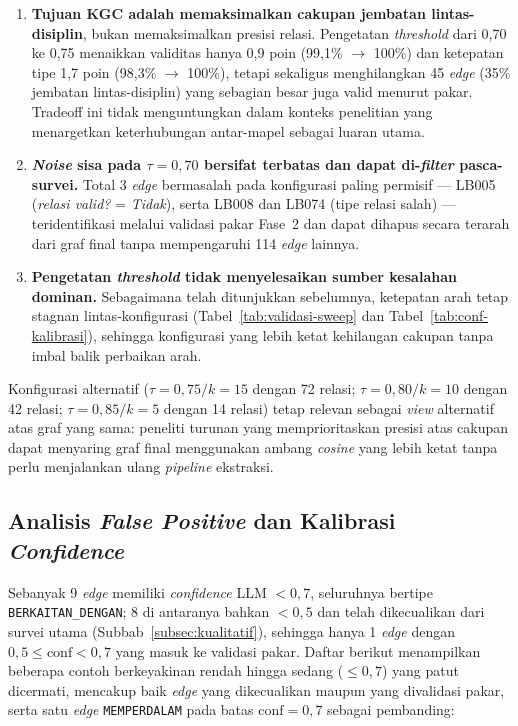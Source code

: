 \documentclass[main]{subfiles}
\begin{document}
\begin{enumerate}
  \item \textbf{Tujuan KGC adalah memaksimalkan cakupan jembatan
    lintas-disiplin}, bukan memaksimalkan presisi relasi. Pengetatan
    \textit{threshold} dari 0{,}70 ke 0{,}75 menaikkan validitas hanya
    0{,}9 poin (99{,}1\% $\to$ 100\%) dan ketepatan tipe 1{,}7 poin
    (98{,}3\% $\to$ 100\%), tetapi sekaligus menghilangkan 45
    \textit{edge} (35\% jembatan lintas-disiplin) yang sebagian besar
    juga valid menurut pakar. Tradeoff ini tidak menguntungkan dalam
    konteks penelitian yang menargetkan keterhubungan antar-mapel
    sebagai luaran utama.

  \item \textbf{\textit{Noise} sisa pada $\tau=0{,}70$ bersifat terbatas
    dan dapat di-\textit{filter} pasca-survei.} Total 3 \textit{edge}
    bermasalah pada konfigurasi paling permisif --- LB005
    (\textit{relasi valid?} = \textit{Tidak}), serta LB008 dan LB074
    (tipe relasi salah) --- teridentifikasi melalui validasi pakar Fase~2
    dan dapat dihapus secara terarah dari graf final tanpa
    mempengaruhi 114 \textit{edge} lainnya.

  \item \textbf{Pengetatan \textit{threshold} tidak menyelesaikan sumber
    kesalahan dominan.} Sebagaimana telah ditunjukkan sebelumnya, ketepatan
    arah tetap stagnan lintas-konfigurasi (Tabel~\ref{tab:validasi-sweep}
    dan Tabel~\ref{tab:conf-kalibrasi}), sehingga konfigurasi yang lebih
    ketat kehilangan cakupan tanpa imbal balik perbaikan arah.
\end{enumerate}

Konfigurasi alternatif ($\tau = 0{,}75 / k=15$ dengan 72 relasi;
$\tau = 0{,}80 / k=10$ dengan 42 relasi; $\tau = 0{,}85 / k=5$ dengan
14 relasi) tetap relevan sebagai \textit{view} alternatif atas graf
yang sama: peneliti turunan yang memprioritaskan presisi atas cakupan
dapat menyaring graf final menggunakan ambang \textit{cosine}
yang lebih ketat tanpa perlu menjalankan ulang \textit{pipeline}
ekstraksi.

\subsection{Analisis \textit{False Positive} dan Kalibrasi \textit{Confidence}}\label{subsubsec:false-positive}

Sebanyak 9 \textit{edge} memiliki \textit{confidence} LLM $< 0{,}7$,
seluruhnya bertipe \texttt{BERKAITAN\_DENGAN}; 8 di antaranya bahkan
$< 0{,}5$ dan telah dikecualikan dari survei utama
(Subbab~\ref{subsec:kualitatif}), sehingga hanya 1 \textit{edge} dengan
$0{,}5\!\le\!\text{conf}\!<\!0{,}7$ yang masuk ke validasi pakar. Daftar
berikut menampilkan beberapa contoh berkeyakinan rendah hingga sedang
($\leq 0{,}7$) yang patut dicermati, mencakup baik \textit{edge} yang
dikecualikan maupun yang divalidasi pakar, serta satu \textit{edge}
\texttt{MEMPERDALAM} pada batas $\text{conf}\!=\!0{,}7$ sebagai pembanding:
\end{document}

